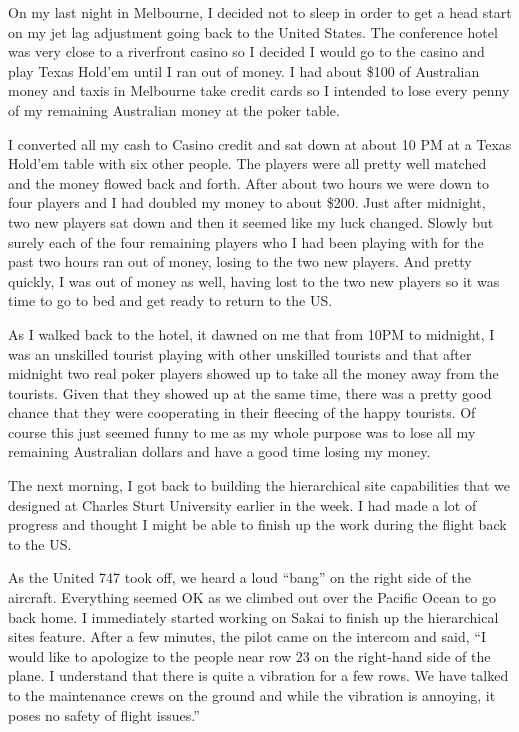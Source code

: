 \documentclass[12pt]{book}
\begin{document}
On my last night in Melbourne, I decided not to sleep in order to get a head start
on my jet lag adjustment going back to the United States.   The conference hotel was very
close to a riverfront casino so I decided I would go to the casino and
play Texas Hold'em until I ran out of money.   I had about \$100 of Australian money
and taxis in Melbourne take credit cards so I intended to lose every penny
of my remaining Australian money at the poker table.

I converted all my cash to Casino credit and sat down at about 10 PM at a Texas Hold'em
table with six other people.  The players were all pretty well matched and the money
flowed back and forth.   After about two hours we were down to four players and I
had doubled my money to about \$200.   Just after midnight, two new players sat down
and then it seemed like my luck changed.   Slowly but surely each of the four remaining
players who I had been playing with for the past two hours ran out of money, losing to
the two new players.   And pretty quickly, I was out of money as well, having lost to
the two new players so it was time to go to bed and get ready to return to the
US.

As I walked back to the hotel, it dawned on me that from 10PM to midnight, I was an
unskilled tourist playing with other unskilled tourists and that after midnight two
real poker players showed up to take all the money away from the tourists.   Given
that they showed up at the same time, there was a pretty good chance that they were
cooperating in their fleecing of the happy tourists.  Of course this just seemed funny to
me as my whole purpose was to lose all my remaining Australian dollars and have
a good time losing my money.

The next morning, I got back to building the hierarchical site capabilities that we
designed at Charles Sturt University earlier in the week.   I had made a lot of
progress and thought I might be able to finish up the work during the flight back
to the US.

As the United 747 took off, we heard a loud ``bang'' on the right side of
the aircraft.   Everything seemed OK as we climbed out over the Pacific Ocean
to go back home.   I immediately started working on Sakai to finish up the hierarchical
sites feature.   After a few minutes, the pilot came on the intercom and said,
``I would like to apologize to the people near row 23 on the right-hand side
of the plane.   I understand that there is quite a vibration for a few rows.
We have talked to the maintenance crews on the ground and while the
vibration is annoying, it poses no safety of flight issues.''
\end{document}

